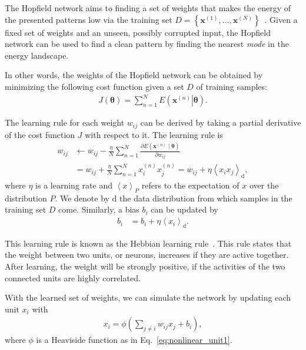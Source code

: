 \documentclass{now}
\newcommand{\vect}[1]{\mathbf{#1}}
\newcommand{\vects}[1]{\boldsymbol{#1}}
\newcommand{\vx}[0]{\vect{x}}
\newcommand{\td}[0]{\text{d}}
\newcommand{\TT}[0]{{\vects{\theta}}}
\begin{document}
The Hopfield network aims to finding a set of weights that makes the energy of
the presented patterns low via the training set $D=\left\{ \vx^{(1)}, \dots,
\vx^{(N)} \right\}$~\citep[see, e.g.,][]{Mackay2002}.  Given a fixed set of
weights and an unseen, possibly corrupted input, the Hopfield network can be
used to find a clean pattern by finding the nearest \textit{mode} in the energy
landscape.

In other words, the weights of the Hopfield network can be obtained by
minimizing the following cost function given a set $D$ of training samples:
\begin{align}
    \label{eq:hopfield_cost}
    J(\TT) = \sum_{n=1}^N E\left(\left.\vx^{(n)} \right| \TT\right).
\end{align}

The learning rule for each weight $w_{ij}$ can be derived by taking a partial
derivative of the cost function $J$ with respect to it. The learning rule is 
\begin{align}
    \label{eq:hopfield_grad}
    w_{ij} &\leftarrow w_{ij} - \frac{\eta}{N} \sum_{n=1}^N
    \frac{\partial E\left(\vx^{(n)} \mid \TT
    \right)}{\partial w_{ij}} 
    \nonumber 
    \\ 
    &= w_{ij} +
    \frac{\eta}{N} \sum_{n=1}^N x_i^{(n)} x_j^{(n)} = w_{ij}
    + \eta \left< x_i x_j \right>_\td,
\end{align}
where $\eta$ is a learning rate and $\left< x \right>_P$ refers to the
expectation of $x$ over the distribution $P$.  We denote by $\td$ the data
distribution from which samples in the training set $D$ come. Similarly, a bias
$b_i$ can be updated by
\begin{align}
    \label{eq:hopfield_grad_b}
    b_{i} &= b_{i} 
    + \eta \left< x_i \right>_\td.
\end{align}

This learning rule is known as the Hebbian learning rule~\citep{Hebb1949}. This
rule states that the weight between two units, or neurons, increases if they
are active together. After learning, the weight will be strongly positive, if
the activities of the two connected units are highly correlated. 

With the learned set of weights, we can simulate the network by updating each
unit $x_i$ with
\begin{align}
    \label{eq:hopfield_cond}
    x_i = \phi\left( \sum_{j \neq i} w_{ij} x_j + b_i
    \right),
\end{align}
where $\phi$ is a Heaviside function as in Eq.~\eqref{eq:nonlinear_unit1}.
\end{document}
